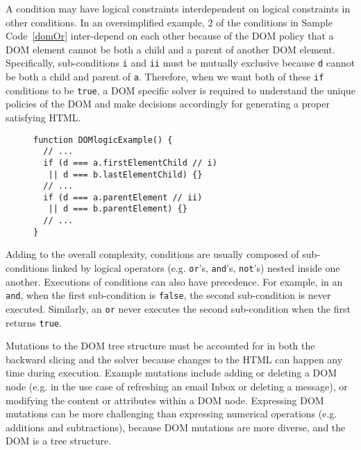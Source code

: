 A condition may have logical constraints interdependent on logical constraints in other conditions.  
In an oversimplified example, 2 of the conditions in Sample Code~\ref{domOr} inter-depend on each other because of the DOM policy that a DOM element cannot be both a child and a parent of another DOM element.  
Specifically, sub-conditions {\tt i} and {\tt ii} must be mutually exclusive because {\tt d} cannot be both a child and parent of {\tt a}.
Therefore, when we want both of these {\tt if} conditions to be {\tt true}, a DOM specific solver is required to understand the unique policies of the DOM and make decisions accordingly for generating a proper satisfying HTML.
\begin{figure}
\begin{lstlisting}[caption=Example code showing conditions that have logical constraints interdepenent with each other.,label=domOr]  
function DOMlogicExample() {
  // ...
  if (d === a.firstElementChild // i)
   || d === b.lastElementChild) {}
  // ... 
  if (d === a.parentElement // ii)
   || d === b.parentElement) {}
  // ...
}
\end{lstlisting}
\end{figure}

Adding to the overall complexity, conditions are usually composed of sub-conditions linked by logical operators (e.g. {\tt or}'s, {\tt and}'s, {\tt not}'s) nested inside one another.
Executions of conditions can also have precedence.  For example, in an {\tt and}, when the first sub-condition is {\tt false}, the second sub-condition is never executed.  Similarly, an {\tt or} never executes the second sub-condition when the first returns {\tt true}.

Mutations to the DOM tree structure must be accounted for in both the backward slicing and the solver because changes to the HTML can happen any time during execution.
Example mutations include adding or deleting a DOM node (e.g. in the use case of refreshing an email Inbox or deleting a message), or modifying the content or attributes within a DOM node.  
Expressing DOM mutations can be more challenging than expressing numerical operations (e.g. additions and subtractions), because DOM mutations are more diverse, and the DOM is a tree structure.


